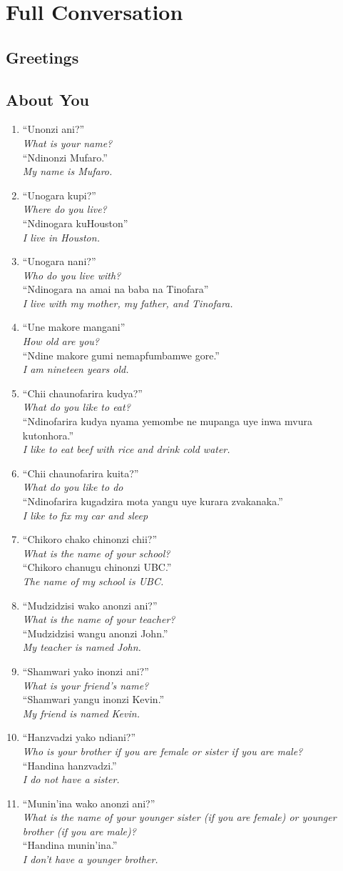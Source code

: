 \documentclass[12pt]{article}
\newcommand{\tl}[2]{``#1''\\\textit{#2}}
\newcommand{\resp}[4]{%
  \tl{#1}{#2} \\
  \tl{#3}{#4}
}
\begin{document}
\section{Full Conversation}

\subsection{Greetings}

\subsection{About You}
\begin{enumerate}
\item \resp{Unonzi ani?}{What is your name?}{Ndinonzi Mufaro.}{My name is Mufaro.}
\item \resp{Unogara kupi?}{Where do you live?}{Ndinogara kuHouston}{I live in Houston.}
\item \resp{Unogara nani?}{Who do you live with?}{Ndinogara na amai na baba na Tinofara}{I live with my mother, my father, and Tinofara.}
\item \resp{Une makore mangani}{How old are you?}{Ndine makore gumi nemapfumbamwe gore.}{I am nineteen years old.}
\item \resp{Chii chaunofarira kudya?}{What do you like to eat?}{Ndinofarira kudya nyama yemombe ne mupanga uye inwa mvura kutonhora.}{I like to eat beef with rice and drink cold water.}
\item \resp{Chii chaunofarira kuita?}{What do you like to do}{Ndinofarira kugadzira mota yangu uye kurara zvakanaka.}{I like to fix my car and sleep}
\item \resp{Chikoro chako chinonzi chii?}{What is the name of your school?}{Chikoro chanugu chinonzi UBC.}{The name of my school is UBC.}
\item \resp{Mudzidzisi wako anonzi ani?}{What is the name of your teacher?}{Mudzidzisi wangu anonzi John.}{My teacher is named John.}
\item \resp{Shamwari yako inonzi ani?}{What is your friend's name?}{Shamwari yangu inonzi Kevin.}{My friend is named Kevin.}
\item \resp{Hanzvadzi yako ndiani?}{Who is your brother if you are female or sister if you are male?}{Handina hanzvadzi.}{I do not have a sister.}
\item \resp{Munin'ina wako anonzi ani?}{What is the name of your younger sister (if you are female) or younger brother (if you are male)?}{Handina munin'ina.}{I don't have a younger brother.}

\end{enumerate}
\end{document}
